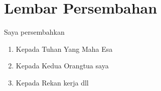 \chapter*{Lembar Persembahan}

  Saya persembahkan
  \begin{enumerate}
      \item Kepada Tuhan Yang Maha Esa
      \item Kepada Kedua Orangtua saya
      \item Kepada Rekan kerja dll
  \end{enumerate}